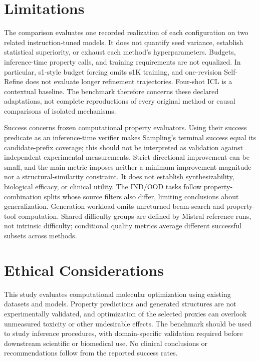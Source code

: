 \section*{Limitations}
The comparison evaluates one recorded realization of each configuration on two related instruction-tuned models. It does not quantify seed variance, establish statistical superiority, or exhaust each method's hyperparameters. Budgets, inference-time property calls, and training requirements are not equalized. In particular, s1-style budget forcing omits s1K training, and one-revision Self-Refine does not evaluate longer refinement trajectories. Four-shot ICL is a contextual baseline. The benchmark therefore concerns these declared adaptations, not complete reproductions of every original method or causal comparisons of isolated mechanisms.

Success concerns frozen computational property evaluators. Using their success predicate as an inference-time verifier makes Sampling's terminal success equal its candidate-prefix coverage; this should not be interpreted as validation against independent experimental measurements. Strict directional improvement can be small, and the main metric imposes neither a minimum improvement magnitude nor a structural-similarity constraint. It does not establish synthesizability, biological efficacy, or clinical utility. The IND/OOD tasks follow property-combination splits whose source filters also differ, limiting conclusions about generalization. Generation workload omits unreturned beam-search and property-tool computation. Shared difficulty groups are defined by Mistral reference runs, not intrinsic difficulty; conditional quality metrics average different successful subsets across methods.

\section*{Ethical Considerations}
This study evaluates computational molecular optimization using existing datasets and models. Property predictions and generated structures are not experimentally validated, and optimization of the selected proxies can overlook unmeasured toxicity or other undesirable effects. The benchmark should be used to study inference procedures, with domain-specific validation required before downstream scientific or biomedical use. No clinical conclusions or recommendations follow from the reported success rates.

